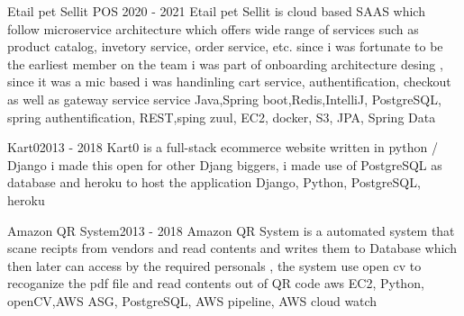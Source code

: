 %
%
%


\begin{projects}
	\project
	{Etail pet Sellit POS }{2020 - 2021}
	{ }
	{Etail pet Sellit is cloud based SAAS which follow microservice architecture which offers wide range of services such as product catalog, invetory service, order service, etc.
	since i was fortunate to be the earliest member on the team i was part of onboarding architecture desing , since it was a mic based i was handinling cart service, authentification, checkout as well as gateway service service
	}
	{Java,Spring boot,Redis,IntelliJ, PostgreSQL, spring authentification, REST,sping zuul, EC2, docker, S3, JPA, Spring Data}
				
	\project
	{Kart0}{2013 - 2018}
	{  }
	{Kart0 is a full-stack ecommerce website written in python / Django i made this open for other Djang biggers, i made use of PostgreSQL as database and heroku to host the application }
	{Django, Python, PostgreSQL, heroku} 

	\project
	{Amazon QR System}{2013 - 2018}
	{}
	{Amazon QR System is a automated system that scane recipts from vendors and read contents and writes them to Database which then later can access by the required personals , the system use open cv to recoganize the pdf file and read contents out of QR code }
	{aws EC2, Python, openCV,AWS ASG, PostgreSQL, AWS pipeline, AWS cloud watch} 

\end{projects}
